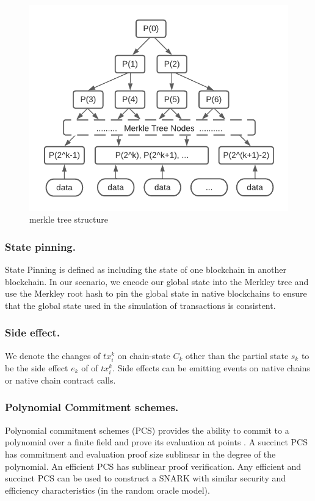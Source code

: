 \documentclass[pageno]{jpaper}
\begin{document}
\begin{figure}[!ht]
\caption{merkle tree structure}
\label{merkle-tree}
\includegraphics[scale=0.6]{merkle-tree}
\end{figure}

\subsubsection{State pinning.}
State Pinning \cite {robinson2019anonymous} is defined as including the state of one blockchain in another blockchain. In our scenario, we encode our global state into the Merkley tree and use the Merkley root hash to pin the global state in native blockchains to ensure that the global state used in the simulation of transactions is consistent.
\\
\subsubsection{Side effect.}
We denote the changes of $tx_i^k$ on chain-state $C_k$ other than the partial state $s_k$ to be the side effect $e_k$ of of $tx_i^k$. Side effects can be emitting events on native chains or native chain contract calls.
\\
\subsubsection{Polynomial Commitment schemes.}
Polynomial commitment schemes (PCS) provides the ability to commit to a polynomial over a finite field and prove its evaluation at points \cite{boneh2021halo}. A succinct PCS has commitment and evaluation proof size sublinear in the degree of the polynomial. An efficient PCS has sublinear proof verification. Any efficient and succinct PCS can be used to construct a SNARK with similar security and efficiency characteristics (in the random oracle model).
\\
\end{document}
